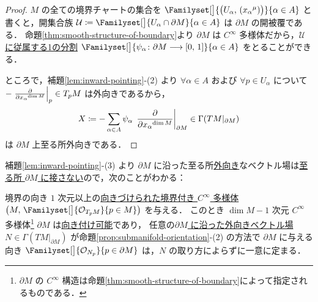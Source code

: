 \documentclass[geometry_main]{subfiles}
\begin{document}
\begin{proof}
	$M$ の全ての境界チャートの集合を $\Familyset[\big]{\bigl(U_\alpha,\, (x_\alpha{}^\mu)\bigr)}{\alpha \in A}$ と書くと，開集合族 $\mathcal{U} \coloneqq \Familyset[\big]{U_\alpha \cap \partial M}{\alpha \in A}$ は $\partial M$ の開被覆である．
	命題\ref{thm:smooth-structure-of-boundary}より $\partial M$ は $C^\infty$ 多様体だから，\hyperref[def:PoU]{$\mathcal{U}$ に従属する1の分割} $\Familyset[\big]{\psi_\alpha \colon \partial M \lto [0,\, 1]}{\alpha \in A}$ をとることができる．
	
	ところで，補題\ref{lem:inward-pointing}-(2) より $\forall \alpha \in A$ および $\forall p \in U_\alpha$ について $-\eval{\pdv{}{x_\alpha{}^{\dim M}}}_p \in T_p M$ は外向きであるから，
	\begin{align}
		X \coloneqq -\sum_{\alpha \in A} \psi_\alpha\,\eval{\pdv{}{x_\alpha{}^{\dim M}}}_{\partial M} \in \Gamma(TM|_{\partial M})
	\end{align}
	は $\partial M$ 上至る所外向きである．
\end{proof}

補題\ref{lem:inward-pointing}-(3) より $\partial M$ に沿った至る所\hyperref[def:inward-pointing]{外向き}なベクトル場は\hyperref[def:vecf-along]{至る所 $\partial M$ に接さない}ので，次のことがわかる：

\begin{myprop}[label=prop:boundary-orientation]{境界の向き}
	$1$ 次元以上の\hyperref[def:smooth-orientation]{向きづけられた境界付き $C^\infty$ 多様体} $\bigl(M,\, \Familyset[\big]{\mathcal{O}_{T_p M}}{p \in M}\bigr)$ を与える．
	このとき $\dim M - 1$ 次元 $C^\infty$ 多様体\footnote{$\partial M$ の $C^\infty$ 構造は命題\ref{thm:smooth-structure-of-boundary}によって指定されるものである．} $\partial M$ は\hyperref[def:smooth-orientation]{向き付け可能}であり，
	任意の\hyperref[def:vecf-along]{$\partial M$ に沿った}\hyperref[def:inward-pointing]{外向きベクトル場} $N \in\Gamma(TM|_{\partial M})$ が命題\ref{prop:submanifold-orientation}-(2) の方法で $\partial M$ に与える向き $\Familyset[\big]{\mathcal{O}_{N_p}}{p \in \partial M}$ は，$N$ の取り方によらずに一意に定まる．
\end{myprop}
\end{document}
